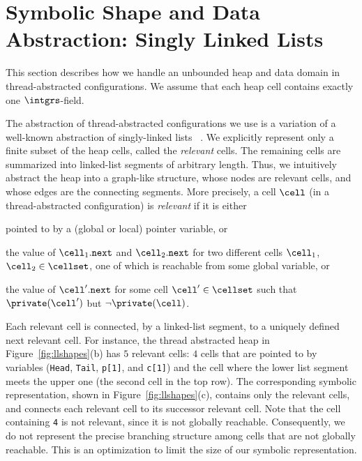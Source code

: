 \section{Symbolic Shape and Data Abstraction: Singly Linked Lists}
\label{sec:annotations}
This section describes how we handle an
unbounded heap and data domain in
thread-abstracted configurations.
We assume that each heap cell contains exactly one $\intgrs$-field.

The abstraction of thread-abstracted configurations we use is a variation of a
  well-known abstraction of singly-linked lists ~\cite{MYRS:Canonical}. We explicitly represent only a finite subset of the heap cells, called
the {\em relevant} cells. The remaining
cells are summarized into linked-list segments of arbitrary length.
Thus, we intuitively abstract the heap into a graph-like  structure, whose
nodes are relevant cells, and whose edges are the connecting segments.
More precisely, 
a cell $\cell$ (in a thread-abstracted configuration) is {\em relevant}
if it is either
\begin{inparaenum}[(i)]
\item
pointed to by a (global or local) pointer variable, or
\item
the value of
${\cell_1.{\tt next}}$ and  ${\cell_2.{\tt next}}$ for
two different cells $\cell_1$, $\cell_2 \in \cellset$,
one of which is reachable from some global variable, or
\item the value of ${\cell'.{\tt next}}$ for some cell $\cell' \in \cellset$
  such that $\private(\cell')$ but $\neg \private(\cell)$.
\end{inparaenum}
Each relevant cell is connected, by a linked-list segment, to a uniquely
defined next relevant cell.
For instance, the thread abstracted
heap in Figure~\ref{fig:llshapes}(b) has $5$ relevant
cells: $4$ cells that are pointed to by variables
({\tt Head}, {\tt Tail}, {\tt p[1]}, and {\tt c[1]}) and the cell where
the lower list segment meets the upper one (the second cell in the top row).
The corresponding symbolic representation, shown 
in Figure~\ref{fig:llshapes}(c), contains only the relevant cells, and
connects each relevant cell to its successor relevant cell. 
Note that the cell containing {\tt 4} is not relevant,
since it is not globally reachable.
Consequently,
we do not represent the precise branching structure among cells that
are not globally reachable. This is an optimization to limit the
size of our symbolic representation.

